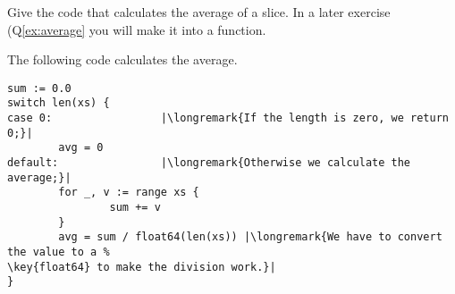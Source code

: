 \begin{Exercise}[title={Average},difficulty=1]
\label{ex:average no func}
\Question\label{ex:average no func q1} Give the code
that calculates the average of a  slice. In
a later exercise (Q\ref{ex:average} you will make it into
a function.
\end{Exercise}

\begin{Answer}
\Question The following code calculates the average.
\begin{lstlisting}
sum := 0.0 
switch len(xs) {
case 0:                 |\longremark{If the length is zero, we return 0;}|
        avg = 0
default:                |\longremark{Otherwise we calculate the average;}|
        for _, v := range xs {
                sum += v
        }
        avg = sum / float64(len(xs)) |\longremark{We have to convert the value to a %
\key{float64} to make the division work.}|
}
\end{lstlisting}
\showremarks
\end{Answer}
